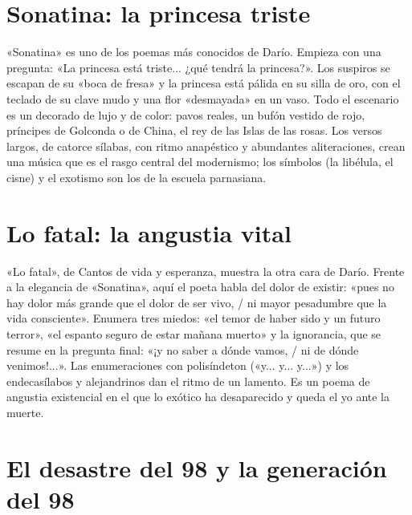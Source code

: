 \documentclass{book}
\begin{document}

\section{Sonatina: la princesa triste}

«Sonatina» es uno de los poemas más conocidos de Darío. Empieza con una pregunta: «La princesa está triste... ¿qué tendrá la princesa?». Los suspiros se escapan de su «boca de fresa» y la princesa está pálida en su silla de oro, con el teclado de su clave mudo y una flor «desmayada» en un vaso. Todo el escenario es un decorado de lujo y de color: pavos reales, un bufón vestido de rojo, príncipes de Golconda o de China, el rey de las Islas de las rosas. Los versos largos, de catorce sílabas, con ritmo anapéstico y abundantes aliteraciones, crean una música que es el rasgo central del modernismo; los símbolos (la libélula, el cisne) y el exotismo son los de la escuela parnasiana.


\section{Lo fatal: la angustia vital}

«Lo fatal», de Cantos de vida y esperanza, muestra la otra cara de Darío. Frente a la elegancia de «Sonatina», aquí el poeta habla del dolor de existir: «pues no hay dolor más grande que el dolor de ser vivo, / ni mayor pesadumbre que la vida consciente». Enumera tres miedos: «el temor de haber sido y un futuro terror», «el espanto seguro de estar mañana muerto» y la ignorancia, que se resume en la pregunta final: «¡y no saber a dónde vamos, / ni de dónde venimos!...». Las enumeraciones con polisíndeton («y... y... y...») y los endecasílabos y alejandrinos dan el ritmo de un lamento. Es un poema de angustia existencial en el que lo exótico ha desaparecido y queda el yo ante la muerte.


\section{El desastre del 98 y la generación del 98}
\end{document}
